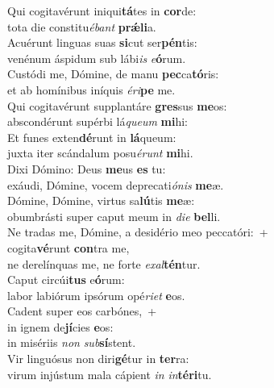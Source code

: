 \evenverse Qui cogitavérunt iniqui\textbf{tá}tes in \textbf{cor}de:~\*\\
\evenverse tota die constitu\textit{é}\textit{bant} \textbf{prǽ}\textbf{li}a.\\
\oddverse Acuérunt linguas suas \textbf{si}cut ser\textbf{pén}tis:~\*\\
\oddverse venénum áspidum sub lábi\textit{is} \textit{e}\textbf{ó}rum.\\
\evenverse Custódi me, Dómine, de manu \textbf{pec}ca\textbf{tó}ris:~\*\\
\evenverse et ab homínibus iníquis \textit{é}\textit{ri}\textbf{pe} me.\\
\oddverse Qui cogitavérunt supplantáre \textbf{gres}sus \textbf{me}os:~\*\\
\oddverse abscondérunt supérbi lá\textit{que}\textit{um} \textbf{mi}hi:\\
\evenverse Et funes exten\textbf{dé}runt in \textbf{lá}queum:~\*\\
\evenverse juxta iter scándalum posu\textit{é}\textit{runt} \textbf{mi}hi.\\
\oddverse Dixi Dómino: Deus \textbf{me}us \textbf{es} tu:~\*\\
\oddverse exáudi, Dómine, vocem deprecati\textit{ó}\textit{nis} \textbf{me}æ.\\
\evenverse Dómine, Dómine, virtus sa\textbf{lú}tis \textbf{me}æ:~\*\\
\evenverse obumbrásti super caput meum in \textit{di}\textit{e} \textbf{bel}li.\\
\oddverse Ne tradas me, Dómine, a desidério meo peccatóri:~+\\
\oddverse  cogita\textbf{vé}runt \textbf{con}tra me,~\*\\
\oddverse ne derelínquas me, ne forte \textit{e}\textit{xal}\textbf{tén}tur.\\
\evenverse Caput circúi\textbf{tus} e\textbf{ó}rum:~\*\\
\evenverse labor labiórum ipsórum opé\textit{ri}\textit{et} \textbf{e}os.\\
\oddverse Cadent super eos carbónes,~+\\
\oddverse  in ignem de\textbf{jí}cies \textbf{e}os:~\*\\
\oddverse in misériis \textit{non} \textit{sub}\textbf{sí}stent.\\
\evenverse Vir linguósus non diri\textbf{gé}tur in \textbf{ter}ra:~\*\\
\evenverse virum injústum mala cápient \textit{in} \textit{in}\textbf{té}\textbf{ri}tu.\\
